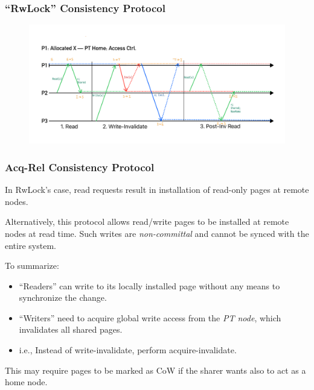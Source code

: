 \documentclass{beamer}
\begin{document}
\begin{frame}
    \frametitle{``RwLock'' Consistency Protocol}
    \begin{figure}
        \centering
        \includegraphics[width=\linewidth]{
            w12_slides_resources/Fig-RwlockProtocol 2023-12-06 19_05_06.pdf
        }
    \end{figure}
\end{frame}

\begin{frame}
    \frametitle{Acq-Rel Consistency Protocol}
    In RwLock's case, read requests result in installation of read-only pages at
    remote nodes.

    Alternatively, this protocol allows read/write pages to be installed at remote
    nodes at read time. Such writes are \emph{non-committal} and cannot be synced
    with the entire system.

    To summarize:
    \begin{itemize}
        \item {
            ``Readers'' can write to its locally installed page without any means
            to synchronize the change.
        }
        \item {
            ``Writers'' need to acquire global write access from the \emph{PT node},
            which invalidates all shared pages.
        }
        \item {
            i.e., Instead of write-invalidate, perform acquire-invalidate.
        }
    \end{itemize}

    This may require pages to be marked as CoW if the sharer wants also to act as a home node.
\end{frame}
\end{document}
